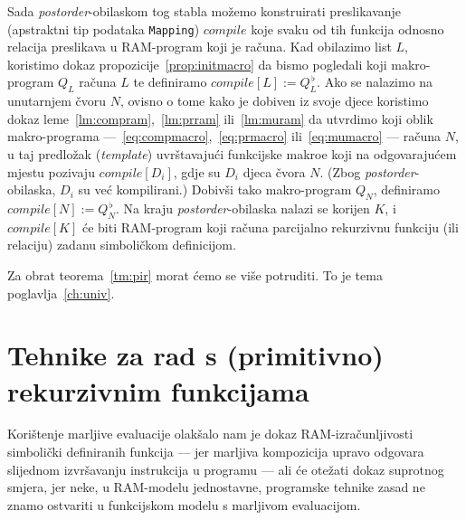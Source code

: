 Sada \emph{postorder}-obilaskom tog stabla možemo konstruirati preslikavanje (apstraktni tip podataka \texttt{Mapping}) $compile$ koje svaku od tih funkcija odnosno relacija preslikava u RAM-program koji je računa. Kad obilazimo list $L$, koristimo dokaz propozicije~\ref{prop:initmacro} da bismo pogledali koji makro-program $Q_L$ računa $L$ te definiramo $compile[L]:=Q_L^{\,\flat}$. Ako se nalazimo na unutarnjem čvoru $N$, ovisno o tome kako je dobiven iz svoje djece koristimo dokaz leme~\ref{lm:compram},~\ref{lm:prram} ili~\ref{lm:muram} da utvrdimo koji oblik makro-programa ---~\eqref{eq:compmacro},~\eqref{eq:prmacro} ili~\eqref{eq:mumacro} --- računa $N$, u taj predložak (\emph{template}) uvrštavajući funkcijske makroe koji na odgovarajućem mjestu pozivaju $compile[D_i]$, gdje su $D_i$ djeca čvora $N$. (Zbog \emph{postorder}-obilaska, $D_i$ su već kompilirani.) Dobivši tako makro-program $Q_N$, definiramo $compile[N]:=Q_N^{\,\flat}$. Na kraju \emph{postorder}-obilaska nalazi se korijen $K$, i $compile[K]$ će biti RAM-program koji računa parcijalno rekurzivnu funkciju (ili relaciju) zadanu simboličkom definicijom.

Za obrat teorema~\ref{tm:pir} morat ćemo se više potruditi. To je tema poglavlja~\ref{ch:univ}.

\section{Tehnike za rad s (primitivno) rekurzivnim funkcijama}\label{sec:tech}

Korištenje marljive evaluacije olakšalo nam je dokaz RAM-izračunljivosti simbolički definiranih funkcija --- jer marljiva kompozicija upravo odgovara slijednom izvršavanju instrukcija u programu --- ali će otežati dokaz suprotnog smjera, jer neke, u RAM-modelu jednostavne, programske tehnike zasad ne znamo ostvariti u funkcijskom modelu s marljivom evaluacijom.

